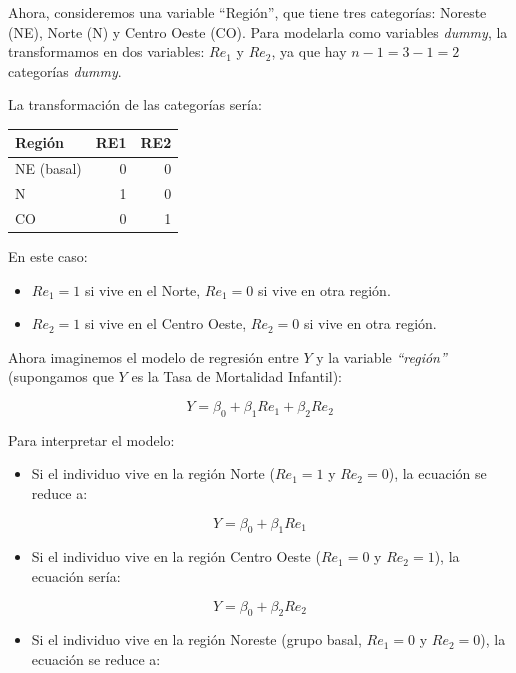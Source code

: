 \documentclass[
  spanish,
  a4paper,
]{scrbook}
\newcounter{none} %
\providecommand{\tightlist}{%
  \setlength{\itemsep}{0pt}\setlength{\parskip}{0pt}}
\begin{document}
Ahora, consideremos una variable ``Región'', que tiene tres categorías:
Noreste (NE), Norte (N) y Centro Oeste (CO). Para modelarla como
variables \emph{dummy}, la transformamos en dos variables: \(Re_1\) y
\(Re_2\), ya que hay \(n-1 = 3-1 = 2\) categorías \emph{dummy}.

La transformación de las categorías sería:

{\def\LTcaptype{none} %
\begin{longtable}[]{@{}lrr@{}}
\toprule\noalign{}
Región & RE1 & RE2 \\
\midrule\noalign{}
\endhead
\bottomrule\noalign{}
\endlastfoot
NE (basal) & 0 & 0 \\
N & 1 & 0 \\
CO & 0 & 1 \\
\end{longtable}
}

En este caso:

\begin{itemize}
\item
  \(Re_1 = 1\) si vive en el Norte, \(Re_1 = 0\) si vive en otra región.
\item
  \(Re_2 = 1\) si vive en el Centro Oeste, \(Re_2 = 0\) si vive en otra
  región.
\end{itemize}

Ahora imaginemos el modelo de regresión entre \(Y\) y la variable
\emph{``región''} (supongamos que \(Y\) es la Tasa de Mortalidad
Infantil):

\[ 
Y = \beta_0+\beta_1Re_1 + \beta_2Re_2 
\]

Para interpretar el modelo:

\begin{itemize}
\tightlist
\item
  Si el individuo vive en la región Norte (\(Re_1 = 1\) y \(Re_2 = 0\)),
  la ecuación se reduce a:
\end{itemize}

\[ 
Y=\beta_0+\beta_1Re_1  
\]

\begin{itemize}
\tightlist
\item
  Si el individuo vive en la región Centro Oeste (\(Re_1 = 0\) y
  \(Re_2 = 1\)), la ecuación sería:
\end{itemize}

\[ 
Y=\beta_0+\beta_2Re_2  
\]

\begin{itemize}
\tightlist
\item
  Si el individuo vive en la región Noreste (grupo basal, \(Re_1 = 0\) y
  \(Re_2 = 0\)), la ecuación se reduce a:
\end{itemize}
\end{document}
